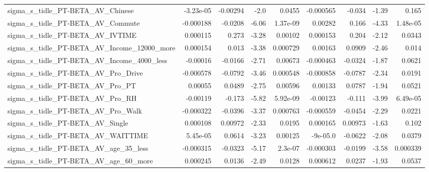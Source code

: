 \begin{tabular}{lrrrrrrrr}
sigma\_s\_tidle\_PT-BETA\_AV\_Chinese                   &   -3.23e-05 &     -0.00294 &      -2.0 &   0.0455 &  -0.000565 &      -0.034 &        -1.39 &         0.165 \\
sigma\_s\_tidle\_PT-BETA\_AV\_Commute                   &   -0.000188 &      -0.0208 &     -6.06 & 1.37e-09 &    0.00282 &       0.166 &        -4.33 &      1.48e-05 \\
sigma\_s\_tidle\_PT-BETA\_AV\_IVTIME                    &    0.000115 &        0.273 &     -3.28 &  0.00102 &   0.000153 &       0.204 &        -2.12 &        0.0343 \\
sigma\_s\_tidle\_PT-BETA\_AV\_Income\_12000\_more         &    0.000154 &        0.013 &     -3.38 & 0.000729 &    0.00163 &      0.0909 &        -2.46 &         0.014 \\
sigma\_s\_tidle\_PT-BETA\_AV\_Income\_4000\_less          &    -0.00016 &      -0.0166 &     -2.71 &  0.00673 &  -0.000463 &     -0.0324 &        -1.87 &        0.0621 \\
sigma\_s\_tidle\_PT-BETA\_AV\_Pro\_Drive                 &   -0.000578 &      -0.0792 &     -3.46 & 0.000548 &  -0.000858 &     -0.0787 &        -2.34 &        0.0191 \\
sigma\_s\_tidle\_PT-BETA\_AV\_Pro\_PT                    &     0.00055 &       0.0489 &     -2.75 &  0.00596 &    0.00133 &      0.0787 &        -1.94 &        0.0521 \\
sigma\_s\_tidle\_PT-BETA\_AV\_Pro\_RH                    &    -0.00119 &       -0.173 &     -5.82 & 5.92e-09 &   -0.00123 &      -0.111 &        -3.99 &      6.49e-05 \\
sigma\_s\_tidle\_PT-BETA\_AV\_Pro\_Walk                  &   -0.000322 &      -0.0396 &     -3.37 & 0.000763 &  -0.000559 &     -0.0454 &        -2.29 &        0.0221 \\
sigma\_s\_tidle\_PT-BETA\_AV\_Single                    &    0.000108 &      0.00972 &     -2.33 &   0.0195 &   0.000165 &     0.00973 &        -1.63 &         0.102 \\
sigma\_s\_tidle\_PT-BETA\_AV\_WAITTIME                  &    5.45e-05 &       0.0614 &     -3.23 &  0.00125 &   -9e-05.0 &     -0.0622 &        -2.08 &        0.0379 \\
sigma\_s\_tidle\_PT-BETA\_AV\_age\_35\_less               &   -0.000315 &      -0.0323 &     -5.17 &  2.3e-07 &  -0.000303 &     -0.0199 &        -3.58 &      0.000339 \\
sigma\_s\_tidle\_PT-BETA\_AV\_age\_60\_more               &    0.000245 &       0.0136 &     -2.49 &   0.0128 &   0.000612 &      0.0237 &        -1.93 &        0.0537 \\

\end{tabular}
